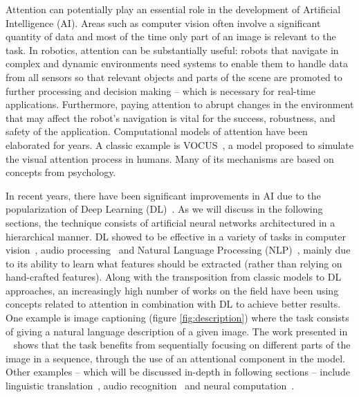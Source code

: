 \documentclass[English]{style/ic-tese-v3}
\begin{document}
Attention can potentially play an essential role in the development
of Artificial Intelligence (AI).
Areas such as computer vision often involve a significant quantity of data
and most of the time only part of an image is relevant to the task.
In robotics, attention can be substantially useful:
robots that navigate in complex and dynamic environments need
systems to enable them to handle data from all sensors
so that relevant objects and parts of the scene are promoted to
further processing and decision making -- which is necessary for real-time applications.
Furthermore, paying attention to abrupt changes in the environment
that may affect the robot's navigation is vital for
the success, robustness, and safety of the application.
Computational models of attention have been elaborated for years.
A classic example is VOCUS~\cite{ref:vocus}, a model proposed to
simulate the visual attention process in humans.
Many of its mechanisms are based on concepts from psychology.

In recent years, there have been significant improvements in
AI due to the popularization of Deep Learning (DL)~\cite{ref:dl}.
As we will discuss in the following sections, the technique consists of
artificial neural networks architectured in a hierarchical manner.
DL showed to be effective in a variety of tasks in
computer vision~\cite{ref:imagenet}\cite{ref:segmentation},
audio processing~\cite{ref:wavenet} and Natural Language
Processing (NLP)~\cite{ref:att-all-you-need}, mainly due to its ability
to learn what features should be extracted (rather than relying on hand-crafted
features).
Along with the transposition from classic models to DL
approaches, an increasingly high number of works on the field
have been using concepts related to attention in combination with DL
to achieve better results.
One example is image captioning (figure \ref{fig:description}) where the task
consists of giving a natural language description of a given image.
The work presented in ~\cite{ref:img-captioning} shows that the task benefits from
sequentially focusing on different parts of the image in a sequence, through the use of an attentional component in the model.
Other examples -- which will be discussed in-depth in following sections -- include linguistic translation~\cite{ref:translation},
audio recognition~\cite{ref:audio} and neural computation~\cite{ref:ntm}.
\end{document}
